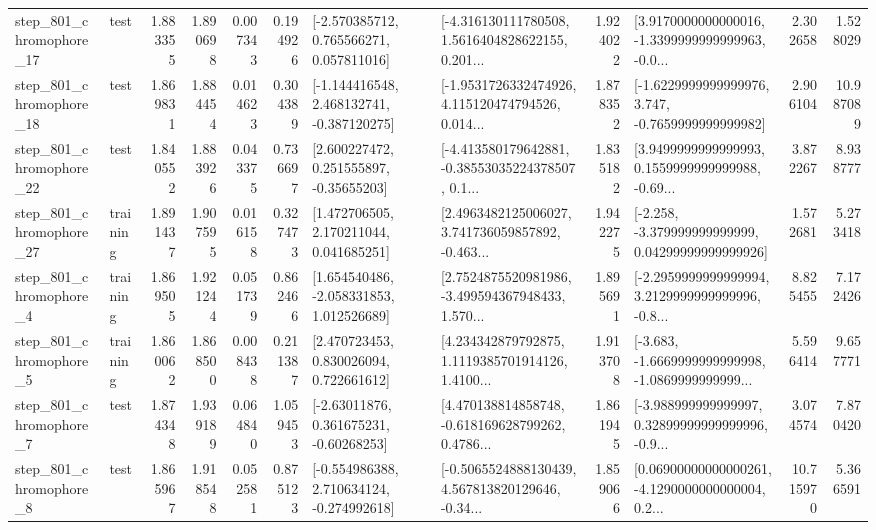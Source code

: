 \begin{tabular}{llrrrrllrlrr}
  step\_801\_chromophore\_17 &      test &      1.883355 &    1.890698 &      0.007343 &  0.194926 &    [-2.570385712, 0.765566271, 0.057811016] &  [-4.316130111780508, 1.5616404828622155, 0.201... &       1.924022 &  [3.9170000000000016, -1.3399999999999963, -0.0... &            2.302658 &          1.528029 \\
  step\_801\_chromophore\_18 &      test &      1.869831 &    1.884454 &      0.014623 &  0.304389 &   [-1.144416548, 2.468132741, -0.387120275] &  [-1.9531726332474926, 4.115120474794526, 0.014... &       1.878352 &  [-1.6229999999999976, 3.747, -0.7659999999999982] &            2.906104 &         10.987089 \\
  step\_801\_chromophore\_22 &      test &      1.840552 &    1.883926 &      0.043375 &  0.736697 &     [2.600227472, 0.251555897, -0.35655203] &  [-4.413580179642881, -0.38553035224378507, 0.1... &       1.835182 &  [3.9499999999999993, 0.1559999999999988, -0.69... &            3.872267 &          8.938777 \\
  step\_801\_chromophore\_27 &  training &      1.891437 &    1.907595 &      0.016158 &  0.327473 &     [1.472706505, 2.170211044, 0.041685251] &  [2.4963482125006027, 3.741736059857892, -0.463... &       1.942275 &  [-2.258, -3.379999999999999, 0.04299999999999926] &            1.572681 &          5.273418 \\
   step\_801\_chromophore\_4 &  training &      1.869505 &    1.921244 &      0.051739 &  0.862466 &    [1.654540486, -2.058331853, 1.012526689] &  [2.7524875520981986, -3.499594367948433, 1.570... &       1.895691 &  [-2.2959999999999994, 3.2129999999999996, -0.8... &            8.825455 &          7.172426 \\
   step\_801\_chromophore\_5 &  training &      1.860062 &    1.868500 &      0.008438 &  0.211387 &     [2.470723453, 0.830026094, 0.722661612] &  [4.234342879792875, 1.1119385701914126, 1.4100... &       1.913708 &  [-3.683, -1.6669999999999998, -1.0869999999999... &            5.596414 &          9.657771 \\
   step\_801\_chromophore\_7 &      test &      1.874348 &    1.939189 &      0.064840 &  1.059453 &     [-2.63011876, 0.361675231, -0.60268253] &  [4.470138814858748, -0.618169628799262, 0.4786... &       1.861945 &  [-3.988999999999997, 0.32899999999999996, -0.9... &            3.074574 &          7.870420 \\
   step\_801\_chromophore\_8 &      test &      1.865967 &    1.918548 &      0.052581 &  0.875123 &   [-0.554986388, 2.710634124, -0.274992618] &  [-0.5065524888130439, 4.567813820129646, -0.34... &       1.859066 &  [0.06900000000000261, -4.1290000000000004, 0.2... &           10.715970 &          5.366591 \\

\end{tabular}
